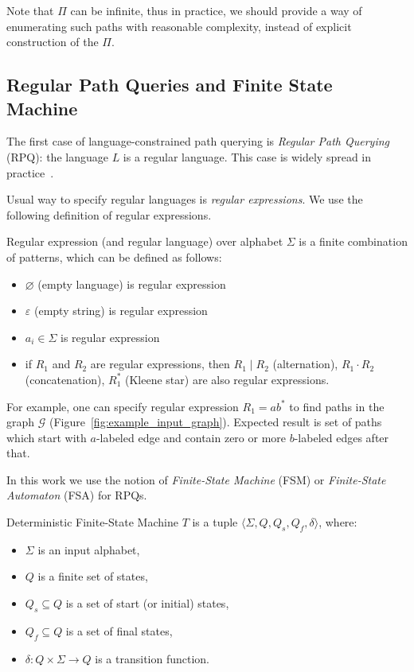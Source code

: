 Note that $\Pi$ can be infinite, thus in practice, we should provide a way of enumerating such paths with reasonable complexity, instead of explicit construction of the $\Pi$.

\subsection{Regular Path Queries and Finite State Machine}

The first case of language-constrained path querying is \textit{Regular Path Querying} (RPQ): the language $L$ is a regular language. This case is widely spread in practice~\cite{!!!}. 

Usual way to specify regular languages is \textit{regular expressions}. 
We use the following definition of regular expressions.
\begin{definition}
Regular expression (and regular language) over alphabet $\Sigma$ is a finite combination of patterns, which can be defined as follows:
\begin{itemize}
    \item $\varnothing$ (empty language) is regular expression
    \item $\varepsilon$ (empty string) is regular expression
    \item $a_i \in \Sigma$ is regular expression
    \item if $R_1$ and $R_2$ are regular expressions, then $R_1 \mid R_2$ (alternation), $R_1 \cdot R_2$ (concatenation), $R_1^*$ (Kleene star) are also regular expressions. 
\end{itemize}
\end{definition} 

For example, one can specify regular expression $R_1 = ab^*$ to find paths in the graph $\mathcal{G}$ (Figure~\ref{fig:example_input_graph}). Expected result is set of paths which start with $a$-labeled edge and contain zero or more $b$-labeled edges after that.

In this work we use the notion of \textit{Finite-State Machine} (FSM) or \textit{Finite-State Automaton} (FSA) for RPQs. 

\begin{definition}
Deterministic Finite-State Machine $T$ is a tuple $\langle \Sigma, Q, Q_s, Q_f, \delta \rangle$, where:
\begin{itemize}
    \item $\Sigma$ is an input alphabet,
    \item $Q$ is a finite set of states,
    \item $Q_s \subseteq Q$ is a set of start (or initial) states,
    \item $Q_f \subseteq Q$ is a set of final states,
    \item $\delta: Q \times \Sigma \to Q$ is a transition function.
\end{itemize}
\end{definition}

